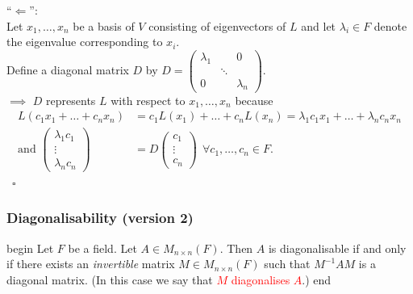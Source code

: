 \documentclass[
  12pt,
  a4paper,
  twoside]{article}
\theoremstyle{plain}
\theoremstyle{definition}
\begin{document}
``\(\Longleftarrow\)'':\\
Let \(x_{1}, \dots, x_{n}\) be a basis of \(V\) consisting of eigenvectors of \(L\) and let \(\lambda_{i} \in F\) denote the eigenvalue corresponding to \(x_{i}\).\\
Define a diagonal matrix \(D\) by \(D = \begin{pmatrix} \lambda_{1} & & 0 \\ & \ddots & \\ 0 & & \lambda_{n} \end{pmatrix}\).\\
\(\implies\) \(D\) represents \(L\) with respect to \(x_{1}, \dots, x_{n}\) because\\
\begin{align*}
L(c_{1}x_{1} + \dots + c_{n}x_{n}) &= c_{1}L(x_{1}) + \dots + c_{n}L(x_{n}) = \lambda_{1}c_{1}x_{1} + \dots + \lambda_{n}c_{n}x_{n}\\
\text{and }\begin{pmatrix} \lambda_{1}c_{1} \\ \vdots \\ \lambda_{n}c_{n} \end{pmatrix} &= D \begin{pmatrix} c_{1} \\ \vdots \\ c_{n} \end{pmatrix} \ \ \forall c_{1}, \dots, c_{n} \in F.
\end{align*}
\hfill~{\(\square\)}

\hypertarget{sss-diag-v2}{%
\subsubsection{Diagonalisability (version 2)}\label{sss-diag-v2}}

\csname begin\label{cnj:prop-diagmatx}
Let \(F\) be a field. Let \(A \in M_{n \times n}(F)\). Then \(A\) is diagonalisable if and only if there exists an \emph{invertible} matrix \(M \in M_{n\times n}(F)\) such that \(M^{-1}AM\) is a diagonal matrix. (In this case we say that \textcolor{red}{$M$ diagonalises $A$}.)
\csname end
\end{document}
